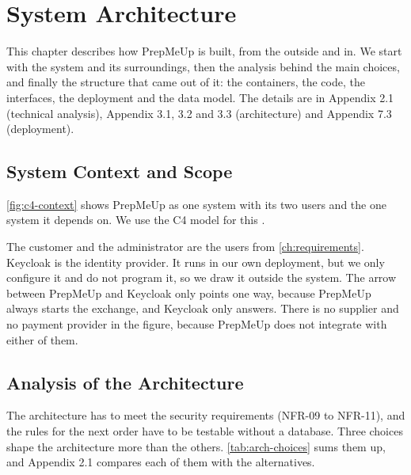 \chapter{System Architecture}\label{ch:architecture}

This chapter describes how PrepMeUp is built, from the outside and in. We start with
the system and its surroundings, then the analysis behind the main choices, and
finally the structure that came out of it: the containers, the code, the interfaces,
the deployment and the data model. The details are in Appendix 2.1
(technical analysis), Appendix 3.1, 3.2 and 3.3 (architecture) and Appendix 7.3
(deployment).

\section{System Context and Scope}\label{sec:arch-context}

\autoref{fig:c4-context} shows PrepMeUp as one system with its two users and the one
system it depends on. We use the C4 model for this \cite{brown-c4-model}.


The customer and the administrator are the users from \autoref{ch:requirements}.
Keycloak is the identity provider. It runs in our own deployment, but we only configure
it and do not program it, so we draw it outside the system. The arrow between PrepMeUp
and Keycloak only points one way, because PrepMeUp always starts the exchange, and
Keycloak only answers. There is no supplier and no payment provider in the figure,
because PrepMeUp does not integrate with either of them.

\section{Analysis of the Architecture}\label{sec:arch-choices}

The architecture has to meet the security requirements (NFR-09 to NFR-11), and the rules
for the next order have to be testable without a database. Three choices shape the architecture more than the others. \autoref{tab:arch-choices}
sums them up, and Appendix 2.1 compares each of them with the alternatives.

